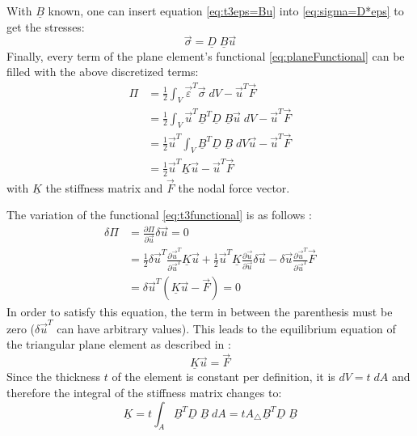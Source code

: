  With $\underline{B}$ known, one can insert equation \eqref{eq:t3eps=Bu} into \eqref{eq:sigma=D*eps} to get the stresses:
  \begin{equation} \label{eq:t3sigma=DBu}
  \vec{\sigma} = \underline{D}\;\underline{B} \vec{u}
  \end{equation}
  Finally, every term of the plane element's functional \eqref{eq:planeFunctional} can be filled with the above discretized terms:
  \begin{align}\label{eq:t3functional}
  \Pi &= \frac{1}{2} \int_{V}\vec{\varepsilon}^T\vec{\sigma}\;dV - \vec{u}^T \vec{F} \nonumber\\
      &= \frac{1}{2} \int_{V}\vec{u}^T \underline{B}^T\underline{D}\;\underline{B}\vec{u}\;dV - \vec{u}^T \vec{F} \nonumber\\
      &= \frac{1}{2} \vec{u}^T \int_{V} \underline{B}^T\underline{D}\;\underline{B}\;dV \vec{u}- \vec{u}^T \vec{F} \nonumber\\
      &= \frac{1}{2}\vec{u}^T \underline{K} \vec{u} - \vec{u}^T \vec{F}
  \end{align}
  with $\underline{K}$ the stiffness matrix and $\vec{F}$ the nodal force vector.
  
  The variation of the functional \eqref{eq:t3functional} is as follows \cite{steinke2005finite}:
  \begin{align}
  \delta\Pi &= \frac{\partial\Pi}{\partial \vec{u}}\delta\vec{u} = 0 \nonumber\\
            &= \frac{1}{2}\delta\vec{u}^T\frac{\partial\vec{u}^T}{\partial\vec{u}^T}\underline{K}\vec{u} + \frac{1}{2}\vec{u}^T\underline{K}\frac{\partial\vec{u}}{\partial\vec{u}}\delta\vec{u} - \delta\vec{u}\frac{\partial\vec{u}^T}{\partial\vec{u}^T}\vec{F} \nonumber\\
            &= \delta\vec{u}^T\left(\underline{K}\vec{u}-\vec{F}\right) = 0
  \end{align}
  In order to satisfy this equation, the term in between the parenthesis must be zero ($\delta\vec{u}^T$ can have arbitrary values). This leads to the equilibrium equation of the triangular plane element as described in \cite{steinke2005finite}:
  \begin{equation}
  \underline{K}\vec{u} = \vec{F}
  \end{equation}
  Since the thickness $t$ of the element is constant per definition, it is $dV = t\;dA$ and therefore the integral of the stiffness matrix changes to:
  \begin{equation}
  \underline{K} = t \int_A \underline{B}^T\underline{D}\;\underline{B}\;dA = t A_\triangle \underline{B}^T\underline{D}\;\underline{B}
  \end{equation}
  
